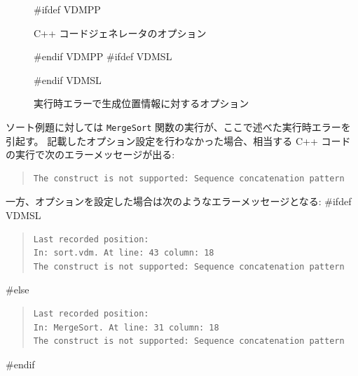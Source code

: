 \documentclass[\pformat,12pt]{jarticle}
\begin{document}
\begin{figure}[tbh]
\begin{center}
\mbox{}
#ifdef VDMPP
\caption{C++ コードジェネレータのオプション}\label{fig:option}
#endif VDMPP
#ifdef VDMSL
\caption{実行時エラーで生成位置情報に対するオプション}\label{fig:option}
#endif VDMSL
\end{center}
\end{figure}
  
ソート例題に対しては \texttt{MergeSort} 関数の実行が、ここで述べた実行時エラーを引起す。
記載したオプション設定を行わなかった場合、相当する C++ コードの実行で次のエラーメッセージが出る:
\begin{quote}
\begin{verbatim}
The construct is not supported: Sequence concatenation pattern
\end{verbatim}
\end{quote}
一方、オプションを設定した場合は次のようなエラーメッセージとなる:
#ifdef VDMSL
\begin{quote}
\begin{verbatim}
Last recorded position:
In: sort.vdm. At line: 43 column: 18
The construct is not supported: Sequence concatenation pattern
\end{verbatim}
\end{quote}
#else
\begin{quote}
\begin{verbatim}
Last recorded position:
In: MergeSort. At line: 31 column: 18
The construct is not supported: Sequence concatenation pattern
\end{verbatim}
\end{quote}
#endif
\end{document}
